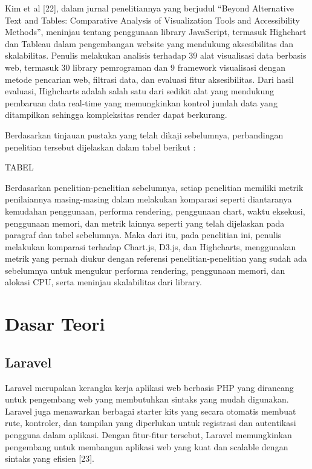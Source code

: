 Kim et al [22], dalam jurnal penelitiannya yang berjudul “Beyond Alternative Text and Tables: Comparative Analysis of Visualization Tools and Accessibility Methods”, meninjau tentang penggunaan library JavaScript, termasuk Highchart dan Tableau dalam pengembangan website yang mendukung aksesibilitas dan skalabilitas. Penulis melakukan analisis terhadap 39 alat visualisasi data berbasis web, termasuk 30 library pemrograman dan 9 framework visualisasi dengan metode pencarian web, filtrasi data, dan evaluasi fitur aksesibilitas. Dari hasil evaluasi, Highcharts adalah salah satu dari sedikit alat yang mendukung pembaruan data real-time yang memungkinkan kontrol jumlah data yang ditampilkan sehingga kompleksitas render dapat berkurang. 

Berdasarkan tinjauan pustaka yang telah dikaji sebelumnya, perbandingan penelitian tersebut dijelaskan dalam tabel berikut :

TABEL 	

Berdasarkan penelitian-penelitian sebelumnya, setiap penelitian memiliki metrik penilaiannya masing-masing dalam melakukan komparasi seperti diantaranya kemudahan penggunaan, performa rendering, penggunaan chart, waktu eksekusi, penggunaan memori, dan metrik lainnya seperti yang telah dijelaskan pada paragraf dan tabel sebelumnya. 
Maka dari itu, pada penelitian ini, penulis melakukan komparasi terhadap Chart.js, D3.js, dan Highcharts, menggunakan metrik yang pernah diukur dengan referensi penelitian-penelitian yang sudah ada sebelumnya untuk mengukur performa rendering, penggunaan memori, dan alokasi CPU, serta meninjau skalabilitas dari library.  

\section{Dasar Teori}

\subsection{Laravel}
Laravel merupakan kerangka kerja aplikasi web berbasis PHP yang dirancang untuk pengembang web yang membutuhkan sintaks yang mudah digunakan. Laravel juga menawarkan berbagai starter kits yang secara otomatis membuat rute, kontroler, dan tampilan yang diperlukan untuk registrasi dan autentikasi pengguna dalam aplikasi. Dengan fitur-fitur tersebut, Laravel memungkinkan pengembang untuk membangun aplikasi web yang kuat dan scalable dengan sintaks yang efisien [23].

